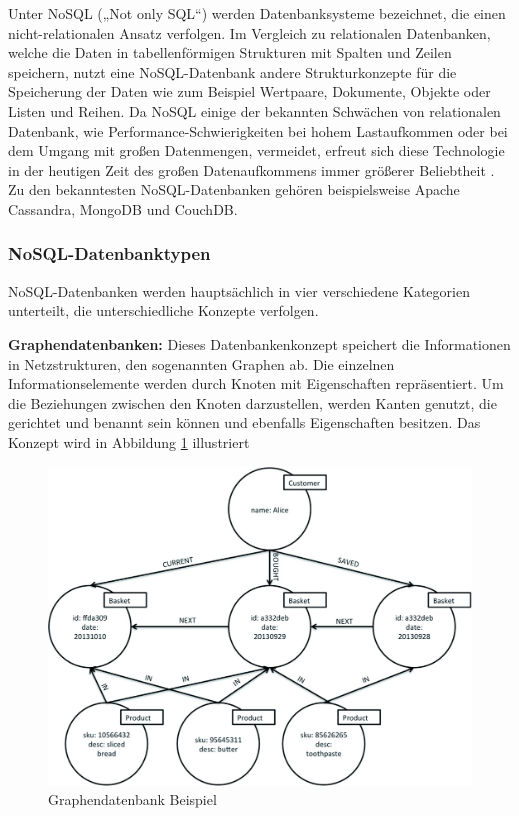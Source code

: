 Unter NoSQL („Not only SQL“) werden Datenbanksysteme bezeichnet, die einen nicht-relationalen Ansatz verfolgen. Im Vergleich zu relationalen Datenbanken, welche die Daten in tabellenförmigen Strukturen mit Spalten und Zeilen speichern, nutzt eine NoSQL-Datenbank andere Strukturkonzepte für die Speicherung der Daten wie zum Beispiel Wertpaare, Dokumente, Objekte oder Listen und Reihen. Da NoSQL einige der bekannten Schwächen von relationalen Datenbank, wie Performance-Schwierigkeiten bei hohem Lastaufkommen oder bei dem Umgang mit großen Datenmengen, vermeidet, erfreut sich diese Technologie in der heutigen Zeit des großen Datenaufkommens immer größerer Beliebtheit \cite{DB1}.
Zu den bekanntesten NoSQL-Datenbanken gehören beispielsweise Apache Cassandra, MongoDB und CouchDB.
\newline

\subsubsection{NoSQL-Datenbanktypen}
NoSQL-Datenbanken werden hauptsächlich in vier verschiedene Kategorien unterteilt, die unterschiedliche Konzepte verfolgen.
\newline

\noindent
{}
\textbf{Graphendatenbanken:}
Dieses Datenbankenkonzept speichert die Informationen in Netzstrukturen, den sogenannten Graphen ab. Die einzelnen Informationselemente werden durch Knoten mit Eigenschaften repräsentiert. Um die Beziehungen zwischen den Knoten darzustellen, werden Kanten genutzt, die gerichtet und benannt sein können und ebenfalls Eigenschaften besitzen. Das Konzept wird in Abbildung \ref{Graphikdatenbank} illustriert

\begin{figure}[tbt]
\centering
\includegraphics[]{images/graphikdatabase.jpg}
\caption[Graphikdatenbank Beispiel]{Graphendatenbank Beispiel \protect \footnotemark}
\label{Graphikdatenbank}
\end{figure}

